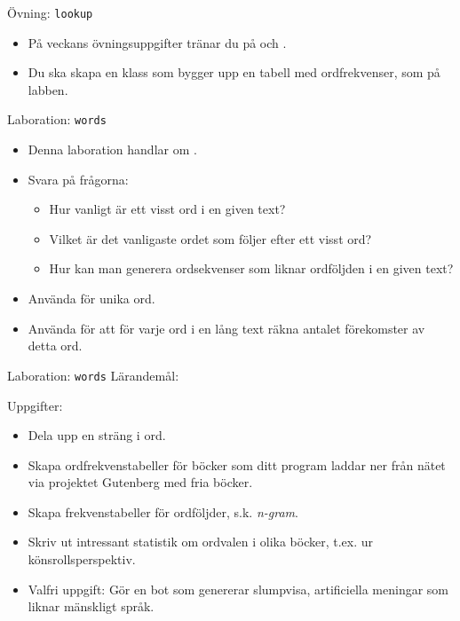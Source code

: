 \begin{Slide}{Övning: \texttt{lookup}}
\begin{itemize}
  \item På veckans övningsuppgifter tränar du på  och .
  \item Du ska skapa en klass  som bygger upp en tabell med ordfrekvenser, som  på labben.
\end{itemize}
\end{Slide}

\begin{Slide}{Laboration: \texttt{words}}
\begin{itemize}
  \item Denna laboration handlar om  .
  \item Svara på frågorna:
  \begin{itemize}%
  \item Hur vanligt är ett visst ord i en given text?
  \item Vilket är det vanligaste ordet som följer efter ett visst ord?
  \item Hur kan man generera ordsekvenser som liknar ordföljden i en given text?
  \end{itemize}
\item Använda  för unika ord.
\item Använda  för att för varje ord i en lång text räkna antalet förekomster av detta ord.
\end{itemize}
\end{Slide}


\begin{Slide}{Laboration: \texttt{words}}
Lärandemål:
\begin{itemize}\SlideFontSmall

\end{itemize}
Uppgifter:
\begin{itemize}\SlideFontSmall
  \item Dela upp en sträng i ord.
  \item Skapa ordfrekvenstabeller för böcker som ditt program laddar ner från nätet via projektet Gutenberg med fria böcker.
  \item Skapa frekvenstabeller för ordföljder, s.k. \emph{n-gram}.
  \item Skriv ut intressant statistik om ordvalen i olika böcker, t.ex. ur könsrollsperspektiv.
  \item Valfri uppgift: Gör en bot som genererar slumpvisa, artificiella meningar som liknar mänskligt språk.
\end{itemize}
\end{Slide}




